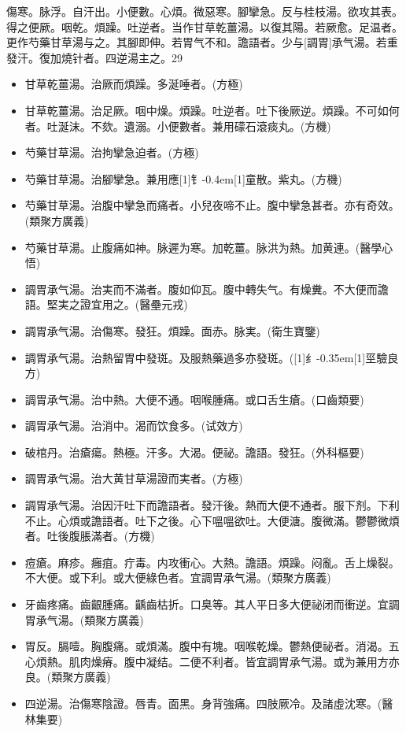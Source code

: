 \documentclass[11pt,oneside,b5paper]{ctexbook}
\begin{document}
\begin{flushleft}
傷寒。脉浮。自汗出。小便數。心煩。微惡寒。腳攣急。反与桂枝湯。欲攻其表。得之便厥。咽乾。煩躁。吐逆者。当作甘草乾薑湯。以復其陽。若厥愈。足温者。更作芍藥甘草湯与之。其腳即伸。若胃气不和。譫語者。少与[調胃]承气湯。若重發汗。復加燒针者。四逆湯主之。29

\begin{itemize}
\item 甘草乾薑湯。治厥而煩躁。多涎唾者。(方極)
\item 甘草乾薑湯。治足厥。咽中燥。煩躁。吐逆者。吐下後厥逆。煩躁。不可如何者。吐涎沫。不欬。遺溺。小便數者。兼用礞石滾痰丸。(方機)
\item 芍藥甘草湯。治拘攣急迫者。(方極)
\item 芍藥甘草湯。治腳攣急。兼用應{\hbox{\scalebox{0.7}[1]{钅}\kern-0.4em\scalebox{0.7}[1]{童}}}散。紫丸。(方機)
\item 芍藥甘草湯。治腹中攣急而痛者。小兒夜啼不止。腹中攣急甚者。亦有奇效。(類聚方廣義)
\item 芍藥甘草湯。止腹痛如神。脉遲为寒。加乾薑。脉洪为熱。加黄連。(醫學心悟)
\item 調胃承气湯。治実而不滿者。腹如仰瓦。腹中轉失气。有燥糞。不大便而譫語。堅実之證宜用之。(醫壘元戎)
\item 調胃承气湯。治傷寒。發狂。煩躁。面赤。脉実。(衛生寶鑒)
\item 調胃承气湯。治熱留胃中發斑。及服熱藥過多亦發斑。({\hbox{\scalebox{0.68}[1]{纟}\kern-0.35em\scalebox{0.64}[1]{巠}}}驗良方)
\item 調胃承气湯。治中熱。大便不通。咽喉腫痛。或口舌生瘡。(口齒類要)
\item 調胃承气湯。治消中。渴而饮食多。(试效方)
\item 破棺丹。治瘡瘍。熱極。汗多。大渴。便祕。譫語。發狂。(外科樞要)
\item 調胃承气湯。治大黄甘草湯證而実者。(方極)
\item 調胃承气湯。治因汗吐下而譫語者。發汗後。熱而大便不通者。服下剂。下利不止。心煩或譫語者。吐下之後。心下嗢嗢欲吐。大便溏。腹微滿。鬱鬱微煩者。吐後腹脹滿者。(方機)
\item 痘瘡。麻疹。癰疽。疔毒。内攻衝心。大熱。譫語。煩躁。闷亂。舌上燥裂。不大便。或下利。或大便綠色者。宜調胃承气湯。(類聚方廣義)
\item 牙齒疼痛。齒齦腫痛。齲齒枯折。口臭等。其人平日多大便祕闭而衝逆。宜調胃承气湯。(類聚方廣義)
\item 胃反。膈噎。胸腹痛。或煩滿。腹中有塊。咽喉乾燥。鬱熱便祕者。消渴。五心煩熱。肌肉燥瘠。腹中凝结。二便不利者。皆宜調胃承气湯。或为兼用方亦良。(類聚方廣義)
\item 四逆湯。治傷寒陰證。唇青。面黑。身背強痛。四肢厥冷。及諸虛沈寒。(醫林集要)

\end{itemize}
\end{flushleft}
\end{document}
